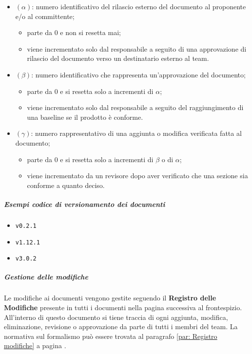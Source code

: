 		\begin{itemize}
			\item \((\alpha)\): numero identificativo del rilascio esterno del documento al proponente e/o al committente;
				\begin{itemize}
					\item parte da 0 e non si resetta mai;
					\item viene incrementato solo dal responsabile a seguito di una approvazione di rilascio del documento verso un destinatario esterno al team.
				\end{itemize}
			\item \((\beta)\): numero identificativo che rappresenta un'approvazione del documento;
				\begin{itemize}
					\item parte da 0 e si resetta solo a incrementi di \(\alpha\);
					\item viene incrementato solo dal responsabile a seguito del raggiungimento di una baseline se il prodotto è conforme.
				\end{itemize}
			\item \((\gamma)\): numero rappresentativo di una aggiunta o modifica verificata fatta al documento;
				\begin{itemize}
					\item parte da 0 e si resetta solo a incrementi di \(\beta\) o di \(\alpha\);
					\item viene incrementato da un revisore dopo aver verificato che una sezione sia conforme a quanto deciso.
				\end{itemize}
		\end{itemize}

		\subparagraph{Esempi codice di versionamento dei documenti}

		\begin{itemize}
			\item \verb!v0.2.1!
			\item \verb!v1.12.1!
			\item \verb!v3.0.2!
		\end{itemize}

		\subparagraph{Gestione delle modifiche}

		Le modifiche ai documenti vengono gestite seguendo il \textbf{Registro delle Modifiche} presente in tutti i documenti nella pagina successiva al frontespizio. All'interno di questo documento si tiene traccia di ogni aggiunta, modifica, eliminazione, revisione o approvazione da parte di tutti i membri del team. La normativa sul formalismo può essere trovata al paragrafo \ref{par: Registro modifiche} a pagina \pageref{par: Registro modifiche}.

